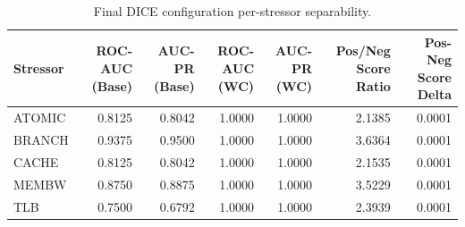 \begin{table}[t]
\centering
\caption{Final DICE configuration per-stressor separability.}
\label{tab:dice_full_stressor}
\footnotesize
\begin{tabular}{lrrrrrr}
\toprule
Stressor & ROC-AUC (Base) & AUC-PR (Base) & ROC-AUC (WC) & AUC-PR (WC) & Pos/Neg Score Ratio & Pos-Neg Score Delta \\
\midrule
ATOMIC & 0.8125 & 0.8042 & 1.0000 & 1.0000 & 2.1385 & 0.0001 \\
BRANCH & 0.9375 & 0.9500 & 1.0000 & 1.0000 & 3.6364 & 0.0001 \\
CACHE & 0.8125 & 0.8042 & 1.0000 & 1.0000 & 2.1535 & 0.0001 \\
MEMBW & 0.8750 & 0.8875 & 1.0000 & 1.0000 & 3.5229 & 0.0001 \\
TLB & 0.7500 & 0.6792 & 1.0000 & 1.0000 & 2.3939 & 0.0001 \\
\bottomrule
\end{tabular}

\end{table}
